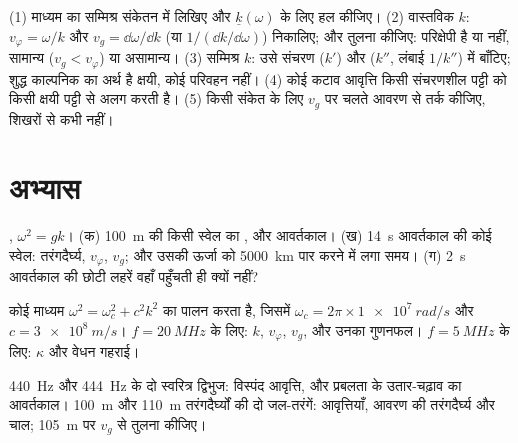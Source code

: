 \begin{method}[कोई परिक्षेपण संबंध पढ़ना]\label{met:b2:dispersion-wave-packets:method}
(1) माध्यम का  सम्मिश्र संकेतन में लिखिए और
$\underline k(\omega)$ के लिए हल कीजिए। (2) वास्तविक $k$: $v_\varphi = \omega/k$ और
$v_g = \dd\omega/\dd k$ (या $1/(\dd k/\dd\omega)$) निकालिए; और तुलना कीजिए: परिक्षेपी है या नहीं,
सामान्य ($v_g < v_\varphi$) या असामान्य। (3) सम्मिश्र $k$: उसे
संचरण ($k'$) और  ($k''$, लंबाई $1/k''$) में बाँटिए; शुद्ध
काल्पनिक का अर्थ है क्षयी, कोई परिवहन नहीं। (4) कोई कटाव आवृत्ति
किसी संचरणशील पट्टी को किसी क्षयी पट्टी से अलग करती है। (5) किसी संकेत के लिए
$v_g$ पर चलते आवरण से तर्क कीजिए, शिखरों से कभी नहीं।
\end{method}

\section{अभ्यास}

\begin{exercise}[$\star$]\label{exo:b2:dispersion-wave-packets:1}
, $\omega^2 = gk$। (क) \qty{100}{m} की किसी स्वेल का ,  और
आवर्तकाल। (ख) \qty{14}{s} आवर्तकाल की कोई स्वेल:
तरंगदैर्घ्य, $v_\varphi$, $v_g$; और उसकी ऊर्जा को \qty{5000}{km} पार करने में लगा समय।
(ग) \qty{2}{s} आवर्तकाल की छोटी लहरें वहाँ पहुँचती ही क्यों नहीं?
\end{exercise}

\begin{exercise}[$\star$]\label{exo:b2:dispersion-wave-packets:2}
कोई माध्यम $\omega^2 = \omega_c^2 + c^2k^2$ का पालन करता है, जिसमें $\omega_c = 2\pi \times \qty{1e7}{rad/s}$
और $c = \qty{3e8}{m/s}$। $f = \qty{20}{MHz}$ के लिए: $k$, $v_\varphi$, $v_g$, और
उनका गुणनफल। $f = \qty{5}{MHz}$ के लिए: $\kappa$ और वेधन गहराई।
\end{exercise}

\begin{exercise}[$\star$]\label{exo:b2:dispersion-wave-packets:3}
\qty{440}{Hz} और \qty{444}{Hz} के दो स्वरित्र द्विभुज: विस्पंद आवृत्ति, और
प्रबलता के उतार-चढ़ाव का आवर्तकाल। \qty{100}{m} और \qty{110}{m}
तरंगदैर्घ्यों की दो जल-तरंगें: आवृत्तियाँ, आवरण की तरंगदैर्घ्य और
चाल; \qty{105}{m} पर $v_g$ से तुलना कीजिए।
\end{exercise}

